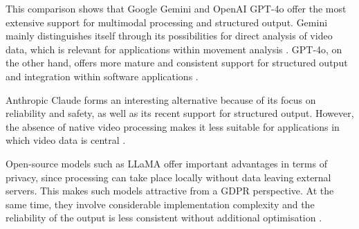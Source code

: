 This comparison shows that Google Gemini and OpenAI GPT-4o offer the most extensive support for multimodal processing and structured output. Gemini mainly distinguishes itself through its possibilities for direct analysis of video data, which is relevant for applications within movement analysis \autocite{gemini_video}. GPT-4o, on the other hand, offers more mature and consistent support for structured output and integration within software applications \autocite{openai_json}.

Anthropic Claude forms an interesting alternative because of its focus on reliability and safety, as well as its recent support for structured output. However, the absence of native video processing makes it less suitable for applications in which video data is central \autocite{claude_vision}.

Open-source models such as LLaMA offer important advantages in terms of privacy, since processing can take place locally without data leaving external servers. This makes such models attractive from a GDPR perspective. At the same time, they involve considerable implementation complexity and the reliability of the output is less consistent without additional optimisation \autocite{llama_privacy}.


